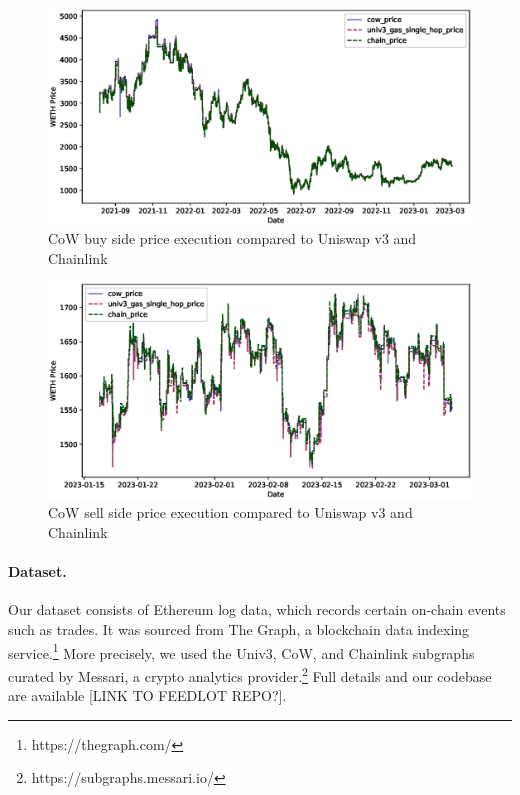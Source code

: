 \documentclass[a4paper,10pt]{article}
\theoremstyle{remark}
\begin{document}
\begin{figure}
  \begin{center} 
    \includegraphics[width=\textwidth * \real{0.7}]{diagrams/weth_buy_line.eps}
    \caption{CoW buy side price execution compared to Uniswap v3 and Chainlink}
  \end{center}
\end{figure}

\begin{figure}
  \begin{center} 
    \includegraphics[width=\textwidth * \real{0.7}]{diagrams/weth_sell_line.eps}
    \caption{CoW sell side price execution compared to Uniswap v3 and Chainlink}
  \end{center}
\end{figure}





\paragraph{Dataset.} Our dataset consists of Ethereum log data, which records certain on-chain events such as trades. It was sourced from The Graph, a blockchain data indexing service.\footnote{https://thegraph.com/}
%
More precisely, we used the Univ3, CoW, and Chainlink subgraphs curated by Messari, a crypto analytics provider.\footnote{https://subgraphs.messari.io/}
%
Full details and our codebase are available [LINK TO FEEDLOT REPO?].
\end{document}

